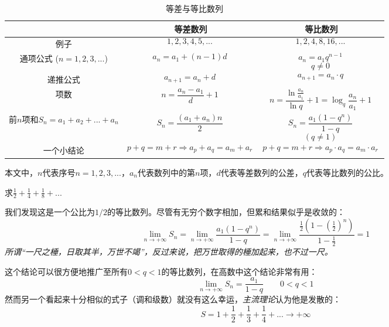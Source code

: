 

\begin{table}[ht]
\centering
\caption{等差与等比数列}\label{tab_AGS1}
\begin{tabular}{|c|c|c|}
\hline
 & 等差数列 & 等比数列 \\
\hline
例子 & $$1,2,3,4,5,...~$$ & $$1,2,4,8,16,...~$$ \\
\hline
通项公式 ($n=1,2,3,...$) & $$a_n = a_1 + (n-1)d~$$ & $$a_n = a_1 q^{n-1}~$$ $$q\ne0~$$ \\
\hline
递推公式 & $$a_{n+1} = a_n + d~$$ & $$a_{n+1} = a_n \cdot q~$$ \\
\hline
项数& $$n = \frac{a_n-a_1}{d} + 1~$$ & $$n = \frac{\ln{\frac{a_n}{a_1}}}{\ln{q}} + 1 = \log_q \frac{a_n}{a_1}+1~$$ \\
\hline
前$n$项和$S_n=a_1+a_2+...+a_n$& $$S_n=\frac{(a_1+a_n)n}{2}~$$ & $$S_n = \frac{a_1 (1-q^n)}{1-q}~$$ $$(q\ne 1)~$$ \\
\hline
一个小结论 & $$p+q=m+r \Rightarrow a_p+a_q = a_m + a_r~$$ & $$p+q=m+r \Rightarrow a_p \cdot a_q = a_m \cdot a_r~$$ \\
\hline
\end{tabular}
\end{table}

本文中，$n$代表序号$n=1,2,3,...$，$a_n$代表数列中的第$n$项，$d$代表等差数列的公差，$q$代表等比数列的公比。

\begin{example}{}
求$\frac{1}{2}+\frac{1}{4}+\frac{1}{8}+...$

我们发现这是一个公比为$1/2$的等比数列。尽管有无穷个数字相加，但累和结果似乎是收敛的：
$$\lim_{n \to +\infty} S_n =  \lim_{n \to +\infty} \frac{a_1 (1-q^n)}{1-q}
= \lim_{n \to +\infty} \frac{\frac{1}{2} (1-(\frac{1}{2})^n)}{1-\frac{1}{2}}
=1 ~$$
\textsl{所谓“一尺之棰，日取其半，万世不竭”，反过来说，把万世取得的棰加起来，也不过一尺。}

这个结论可以很方便地推广至所有$0<q<1$的等比数列，在高数中这个结论非常有用：
$$\lim_{n \to +\infty} S_n =  \frac{a_1}{1-q} \qquad 0<q<1~$$
然而另一个看起来十分相似的式子（调和级数）就没有这么幸运，\textsl{主流理论}认为他是发散的：
$$S = 1+\frac{1}{2}+\frac{1}{3}+\frac{1}{4}+...\to+\infty~$$
\end{example}
